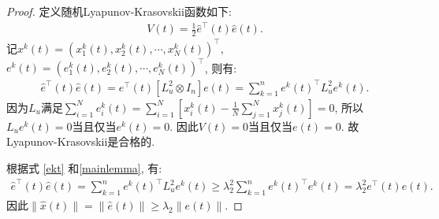         \begin{proof}
        定义随机Lyapunov-Krasovskii函数如下:
        \begin{align*}
        V(t)=\frac{1}{2}\hat{e}^\top(t)\hat{e}(t).
        \end{align*}
        记$x^k(t)=(x_1^k(t),x_2^k(t),\cdots,x_N^k(t))^\top$, $e^k(t)=(e_1^k(t),e_2^k(t),\cdots,e_N^k(t))^\top$, 则有:
        \begin{align}\label{ekt}
        \hat{e}^\top(t)\hat{e}(t)=e^\top(t)[L^2_u\otimes I_n]e(t)=\sum_{k=1}^ne^k(t)^\top L^2_ue^k(t).
        \end{align}
        因为$L_u$满足$\sum_{i=1}^Ne_i^k(t)=\sum_{i=1}^N[x_i^k(t)-\frac{1}{N}\sum_{j=1}^Nx_j^k(t)]=0$, 所以$L_ue^k(t)=0$当且仅当$e^k(t)=0$.
        因此$V(t)=0$当且仅当$e(t)=0$. 故Lyapunov-Krasovskii是合格的.

        根据式 \eqref{ekt} 和\autoref{mainlemma}, 有:
        \begin{align*}
        \hat{e}^\top(t)\hat{e}(t)=\sum_{k=1}^ne^k(t)^\top L^2_ue^k(t)\geq\lambda_2^2\sum_{k=1}^ne^k(t)^\top e^k(t)=\lambda_2^2e^\top(t)e(t).
        \end{align*}
        因此$\|\hat{x}(t)\|=\|\hat{e}(t)\|\geq\lambda_2\|e(t)\|$.


\end{proof}
